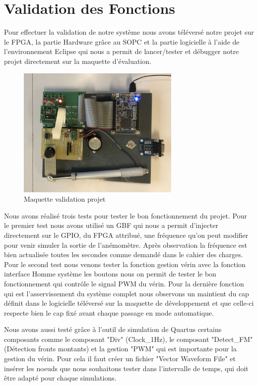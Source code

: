 \section{Validation des Fonctions}
Pour effectuer la validation de notre système nous avons téléversé notre projet sur le FPGA, la partie Hardware grâce au SOPC et la partie logicielle à l'aide de l'environnement Eclipse qui nous a permit de lancer/tester et débugger notre projet directement sur la maquette d'évaluation.

\begin{figure}[h]
    \begin{center}
      \includegraphics[width=0.7\textwidth]{images/maquette.jpg}
      \caption{Maquette validation projet}
    \end{center}
  \end{figure}

  Nous avons réalisé trois tests pour tester le bon fonctionnement du projet. Pour le premier test nous avons utilisé un GBF qui nous a permit d'injecter directement sur le GPIO, du FPGA attribué, une fréquence qu'on peut modifier pour venir simuler la sortie de l'anémomètre. Après observation la fréquence est bien actualisée toutes les secondes comme demandé dans le cahier des charges. Pour le second test nous venons tester la fonction gestion vérin avec la fonction interface Homme système les boutons nous on permit de tester le bon fonctionnement qui contrôle le signal PWM du vérin. Pour la dernière fonction qui est l'asservissement du système complet nous observons un maintient du cap définit dans le logicielle téléversé sur la maquette de développement et que celle-ci respecte bien le cap fixé avant chaque passage en mode automatique.\newline

  Nous avons aussi testé grâce à l'outil de simulation de Quartus certains composants comme le composant "Div" (Clock\_1Hz), le composant "Detect\_FM" (Détection fronts montants) et la gestion "PWM" qui est importante pour la gestion du vérin. Pour cela il faut créer un fichier "Vector Waveform File" et insérer les noeuds que nous souhaitons tester dans l'intervalle de temps, qui doit être adapté pour chaque simulations.
  \newpage

